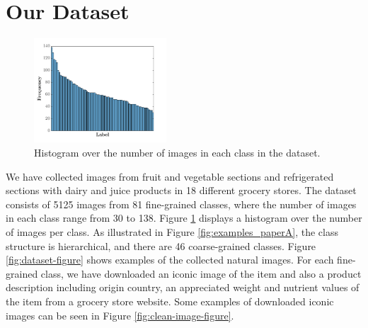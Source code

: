 \section{Our Dataset}\label{paperA:sec:our_dataset}

\begin{figure}
	\centering
	\vspace{-6mm}
	\includegraphics[width=0.44\textwidth]{PaperA/figures/hist1_latex_bf14.png}
	\vspace{-6mm}
	\captionsetup{width=.9\linewidth}
	\caption{Histogram over the number of images in each class in the dataset.}
	\vspace{-2mm}
	\label{fig:hist}
\end{figure}
We have collected images from fruit and vegetable sections and refrigerated sections with dairy and juice products in 18 different grocery stores. The dataset consists of 5125 images from 81 fine-grained classes, where the number of images in each class range from 30 to 138. Figure \ref{fig:hist} displays a histogram over the number of images per class. As illustrated in Figure \ref{fig:examples_paperA}, the class structure is hierarchical, and there are 46 coarse-grained classes. Figure \ref{fig:dataset-figure} shows examples of the collected natural images. For each fine-grained class, we have downloaded an iconic image of the item and also a product description including origin country, an appreciated weight and nutrient values of the item from a grocery store website. Some examples of downloaded iconic images can be seen in Figure \ref{fig:clean-image-figure}. 


